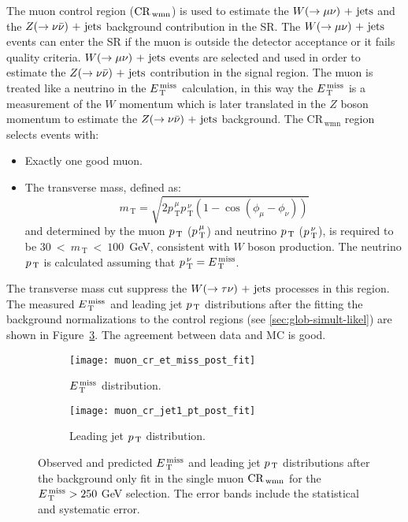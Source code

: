 The muon control region ($\mathrm{CR}_\mathrm{\, wmn}$) is used to estimate the $W (\rightarrow \mu \nu)\mathrm{~+~jets}$ and
the $Z (\rightarrow \nu \bar{\nu})\mathrm{~+~jets}$ background contribution in the SR\@. The $W (\rightarrow \mu \nu)\mathrm{~+~jets}$
events can enter the SR if the muon is outside the detector acceptance or it
fails quality criteria. $W (\rightarrow \mu \nu)\mathrm{~+~jets}$ events are selected and used in order
to estimate the $Z (\rightarrow \nu \bar{\nu})\mathrm{~+~jets}$ contribution in the signal region. The muon is
treated like a neutrino in the $E_\mathrm{\, T}^\mathrm{\, miss}$ calculation, in this way the $E_\mathrm{\, T}^\mathrm{\, miss}$ is a
measurement of the $W$ momentum which is later translated in the $Z$ boson
momentum to estimate the $Z (\rightarrow \nu \bar{\nu})\mathrm{~+~jets}$ background. The CR$_{\mathrm{\, wmn}}$
region selects events with:
\begin{itemize}
\item Exactly one good muon.
\item The transverse mass, defined as:
  \begin{equation}
    \label{eq:99}
    m_\mathrm{\, T} = \sqrt{2 p_\mathrm{\, T}^{\, \mu} p_\mathrm{\, T}^{\, \nu}
      (1 - \cos(\phi_\mu - \phi_\nu))}
  \end{equation}
  and determined by the muon $p_\mathrm{\, T}$ ($p_\mathrm{\, T}^{\, \mu}$) and neutrino $p_\mathrm{\, T}$
  ($p_\mathrm{\, T}^{\, \nu}$), is required to be $30~<~m_\mathrm{\, T}~<~100$~GeV,
  consistent with $W$ boson production. The neutrino $p_\mathrm{\, T}$ is calculated
  assuming that $p_\mathrm{\, T}^{\, \nu} = E_\mathrm{\, T}^\mathrm{\, miss}$.
\end{itemize}
The transverse mass cut suppress the $W (\rightarrow \tau \nu)\mathrm{~+~jets}$ processes in this
region. The measured $E_\mathrm{\, T}^\mathrm{\, miss}$ and leading jet $p_\mathrm{\, T}$ distributions after the
fitting the background normalizations to the control regions (see
\cref{sec:glob-simult-likel}) are shown in Figure~\ref{fig:muon_cr_plots}. The
agreement between data and MC is good.
\begin{figure}[!h]
  \centering
  \begin{subfigure}[t]{.48\linewidth}
    \texttt{[image: muon\_cr\_et\_miss\_post\_fit]}
    \caption{$E_\mathrm{\, T}^\mathrm{\, miss}$ distribution.}
    \label{fig:muon_cr_et_miss_pre_fit}
  \end{subfigure}
  \begin{subfigure}[t]{.48\linewidth}
    \texttt{[image: muon\_cr\_jet1\_pt\_post\_fit]}
    \caption{Leading jet $p_\mathrm{\, T}$ distribution.}
    \label{fig:muon_cr_jet1_pt_pre_fit}
  \end{subfigure}
  \caption{Observed and predicted $E_\mathrm{\, T}^\mathrm{\, miss}$ and leading jet $p_\mathrm{\, T}$ distributions
    after the background only fit in the single muon $\mathrm{CR}_\mathrm{\, wmn}$ for the
    $E_\mathrm{\, T}^\mathrm{\, miss} > 250~$GeV selection. The error bands include the statistical and
    systematic error.}
  \label{fig:muon_cr_plots}
\end{figure}
